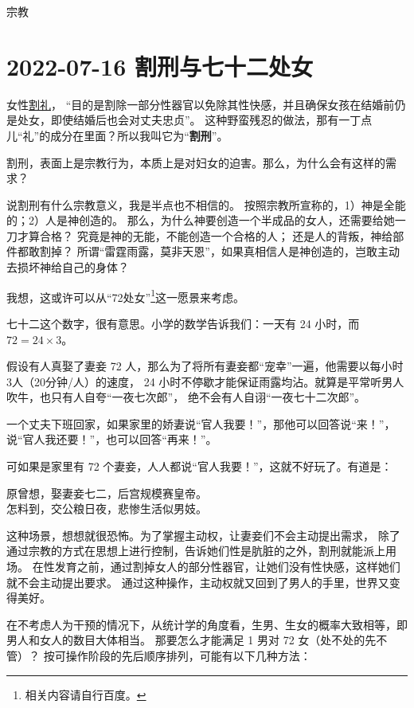 \begin{taged}{宗教}
\section{2022-07-16 割刑与七十二处女}
\end{taged}

女性\href{https://baike.baidu.com/item/%E5%89%B2%E7%A4%BC/2056506}{割礼}，
“目的是割除一部分性器官以免除其性快感，并且确保女孩在结婚前仍是处女，即使结婚后也会对丈夫忠贞”。
这种野蛮残忍的做法，那有一丁点儿“礼”的成分在里面？所以我叫它为“\textbf{割刑}”。

割刑，表面上是宗教行为，本质上是对妇女的迫害。那么，为什么会有这样的需求？

说割刑有什么宗教意义，我是半点也不相信的。
按照宗教所宣称的，1）神是全能的；2）人是神创造的。
那么，为什么神要创造一个半成品的女人，还需要给她一刀才算合格？
究竟是神的无能，不能创造一个合格的人；
还是人的背叛，神给部件都敢割掉？
所谓“雷霆雨露，莫非天恩”，如果真相信人是神创造的，岂敢主动去损坏神给自己的身体？


我想，这或许可以从“72处女”\footnote{相关内容请自行百度。}这一愿景来考虑。

七十二这个数字，很有意思。小学的数学告诉我们：一天有 24 小时，而 $72 = 24 \times 3$。

假设有人真娶了妻妾 72 人，那么为了将所有妻妾都“宠幸”一遍，他需要以每小时3人（20分钟/人）的速度，
24 小时不停歇才能保证雨露均沾。就算是平常听男人吹牛，也只有人自夸“一夜七次郎”，
绝不会有人自诩“一夜七十二次郎”。

一个丈夫下班回家，如果家里的娇妻说“官人我要！”，那他可以回答说“来！”，说“官人我还要！”，也可以回答“再来！”。

可如果是家里有 72 个妻妾，人人都说“官人我要！”，这就不好玩了。有道是：
\begin{shici}
    原曾想，娶妻妾七二，后宫规模赛皇帝。\\
    怎料到，交公粮日夜，悲惨生活似男妓。
\end{shici}

这种场景，想想就很恐怖。为了掌握主动权，让妻妾们不会主动提出需求，
除了通过宗教的方式在思想上进行控制，告诉她们性是肮脏的之外，割刑就能派上用场。
在性发育之前，通过割掉女人的部分性器官，让她们没有性快感，这样她们就不会主动提出要求。
通过这种操作，主动权就又回到了男人的手里，世界又变得美好。



\contentsep

在不考虑人为干预的情况下，从统计学的角度看，生男、生女的概率大致相等，即男人和女人的数目大体相当。
那要怎么才能满足 1 男对 72 女（处不处的先不管）？
按可操作阶段的先后顺序排列，可能有以下几种方法：

